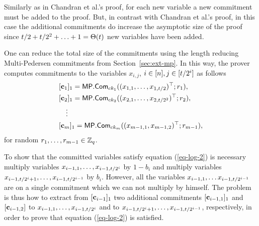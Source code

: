 Similarly as in Chandran et al.'s proof, for each new variable a new commitment must be added to the proof. But, in contrast with Chandran et al.'s proof, in this case the additional commitments do increase the asymptotic size of the proof since \(t /2+t /2^2+\ldots+1=\Theta(t )\) new variables have been added.

One can reduce the total size of the commitments using the length reducing Multi-Pedersen commitments from Section~\ref{sec:ext-mp}. In this way, the prover computes commitments to the variables $x_{i,j}$, $i\in[n],j\in[t/2^i]$ as follows
\begin{align*}
&[\mathbf{c}_1]_1=\mathsf{MP}.\mathsf{Com}_{ck_1}((x_{1,1},\ldots,x_{1,t /2})^\top;r_1),\\
&[\mathbf{c}_2]_1=\mathsf{MP}.\mathsf{Com}_{ck_2}((x_{2,1},\ldots,x_{2,t /2^2})^\top;r_2),\\
&\quad\vdots\\
&[\mathbf{c}_{m}]_1=\mathsf{MP}.\mathsf{Com}_{ck_{m}}((x_{m-1,1},x_{m-1,2})^\top;r_{m-1}),
\end{align*}
for random $r_1,\ldots,r_{m-1}\in\mathbb{Z}_q$. 

To show that the committed variables satisfy equation (\ref{eq-log-2}) is necessary multiply variables \(x_{i-1,1},\ldots,x_{i-1,t /2^i}\) by \(1-b_i\) and multiply variables \(x_{i-1,t /2^i+1},\ldots,\allowbreak x_{i-1,t /2^{i-1}}\) by \(b_i\). However, all the variables $x_{i-1,1},\ldots x_{i-1,t /2^{i-1}}$ are on a single commitment which we can not multiply by himself.
The problem is thus how to extract from \([\mathbf{c}_{i-1}]_1\) two additional commitments \([\mathbf{c}_{i-1,1}]_1\) and \([\mathbf{c}_{i-1,2}]\) to \(x_{i-1,1},\ldots,x_{i-1,t /2^i}\) and to \(x_{i-1,t /2^i+1},\ldots,x_{i-1,t /2^{i-1}}\), respectively, in order to prove that equation (\ref{eq-log-2}) is satisfied.

